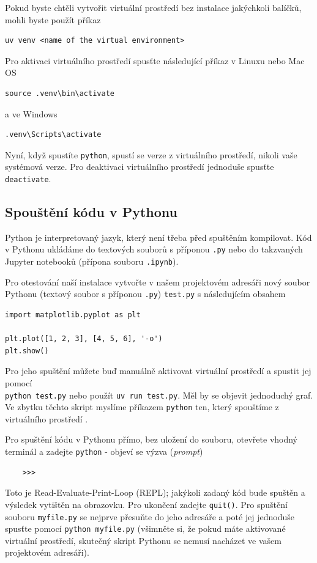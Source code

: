 Pokud byste chtěli vytvořit virtuální prostředí bez instalace jakýchkoli balíčků, mohli byste použít příkaz
\begin{lstlisting}
uv venv <name of the virtual environment>
\end{lstlisting}

Pro aktivaci virtuálního prostředí spusťte následující příkaz v Linuxu nebo Mac OS
\begin{lstlisting}
source .venv\bin\activate
\end{lstlisting}
a ve Windows
\begin{lstlisting}
.venv\Scripts\activate
\end{lstlisting}

Nyní, když spustíte \verb|python|, spustí se verze z virtuálního prostředí, nikoli vaše systémová verze. Pro deaktivaci virtuálního prostředí jednoduše spusťte \verb|deactivate|.

\subsection{Spouštění kódu v Pythonu}
Python je interpretovaný jazyk, který není třeba před spuštěním kompilovat. Kód v Pythonu ukládáme do textových souborů s příponou \verb|.py| nebo do takzvaných Jupyter notebooků (přípona souboru \verb|.ipynb|).

Pro otestování naší instalace vytvořte v našem projektovém adresáři nový soubor Pythonu (textový soubor s příponou \verb|.py|) \verb|test.py| s následujícím obsahem
\begin{lstlisting}
import matplotlib.pyplot as plt

plt.plot([1, 2, 3], [4, 5, 6], '-o')
plt.show()
\end{lstlisting}
Pro jeho spuštění můžete buď manuálně aktivovat virtuální prostředí a spustit jej pomocí\\
\verb|python test.py| nebo použít \verb|uv run test.py|. Měl by se objevit jednoduchý graf. Ve zbytku těchto skript myslíme příkazem \verb|python| ten, který spouštíme z virtuálního prostředí .

Pro spuštění kódu v Pythonu přímo, bez uložení do souboru, otevřete vhodný terminál a zadejte \verb|python| - objeví se výzva (\emph{prompt})
\begin{lstlisting}
    >>>
\end{lstlisting}
Toto je Read-Evaluate-Print-Loop (REPL); jakýkoli zadaný kód bude spuštěn a výsledek vytištěn na obrazovku. Pro ukončení zadejte \verb|quit()|. Pro spuštění souboru \verb|myfile.py| se nejprve přesuňte do jeho adresáře a poté jej jednoduše spusťte pomocí \verb|python myfile.py| (všimněte si, že pokud máte aktivované virtuální prostředí, skutečný skript Pythonu se nemusí nacházet ve vašem projektovém adresáři).

